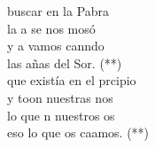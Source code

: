 \begin{cancion}%
	 buscar en la Pabra\\
	la a se nos mosó\\
	y a  vamos canndo \\
	las añas del Sor. (**) \\
	 que existía en el prcipio \\
	y toon nuestras nos\\
	lo que n nuestros os \\
	eso lo que os caamos. (**)\\
\end{cancion}%
